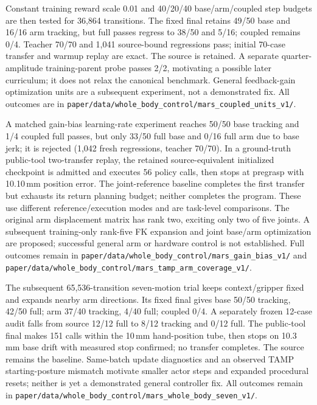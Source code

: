 Constant training reward scale 0.01 and 40/20/40 base/arm/coupled step budgets
are then tested for 36,864 transitions. The fixed final retains 49/50 base and
16/16 arm tracking, but full passes regress to 38/50 and 5/16; coupled remains
0/4. Teacher 70/70 and 1,041 source-bound regressions pass; initial 70-case
transfer and warmup replay are exact. The source is retained. A separate
quarter-amplitude training-parent probe passes 2/2, motivating a possible later
curriculum; it does not relax the canonical benchmark. General feedback-gain
optimization units are a subsequent experiment, not a demonstrated fix.
All outcomes are in
\texttt{paper/data/whole\_body\_control/mars\_coupled\_units\_v1/}.


A matched gain-bias learning-rate experiment reaches 50/50 base tracking and
1/4 coupled full passes, but only 33/50 full base and 0/16 full arm due to base
jerk; it is rejected (1,042 fresh regressions, teacher 70/70). In a ground-truth
public-tool two-transfer replay, the retained source-equivalent initialized
checkpoint is admitted and executes 56 policy calls, then stops at pregrasp
with 10.10\,mm position error. The joint-reference baseline completes the first
transfer but exhausts its return planning budget; neither completes the program.
These use different reference/execution modes and are task-level comparisons.
The original arm displacement matrix has rank two, exciting only two of five
joints. A subsequent training-only rank-five FK expansion and joint base/arm
optimization are proposed; successful general arm or hardware control is not
established. Full outcomes remain in
\texttt{paper/data/whole\_body\_control/mars\_gain\_bias\_v1/} and
\texttt{paper/data/whole\_body\_control/mars\_tamp\_arm\_coverage\_v1/}.


The subsequent 65,536-transition seven-motion trial keeps context/gripper fixed
and expands nearby arm directions. Its fixed final gives base 50/50 tracking,
42/50 full; arm 37/40 tracking, 4/40 full; coupled 0/4. A separately frozen
12-case audit falls from source 12/12 full to 8/12 tracking and 0/12 full. The
public-tool final makes 151 calls within the 10\,mm hand-position tube, then
stops on 10.3\,mm base drift with measured stop confirmed; no transfer completes.
The source remains the baseline. Same-batch update diagnostics and an observed
TAMP starting-posture mismatch motivate smaller actor steps and expanded
procedural resets; neither is yet a demonstrated general controller fix.
All outcomes remain in
\texttt{paper/data/whole\_body\_control/mars\_whole\_body\_seven\_v1/}.


